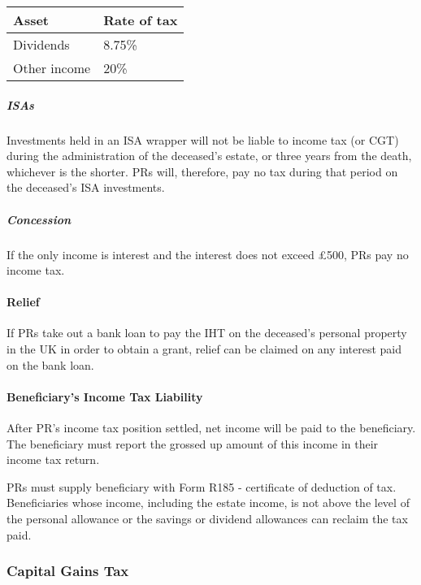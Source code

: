 \documentclass[
]{article}
\begin{document}
\begin{longtable}[]{@{}ll@{}}
\toprule()
Asset & Rate of tax \\
\midrule()
\endhead
Dividends & 8.75\% \\
Other income & 20\% \\
\bottomrule()
\end{longtable}

\hypertarget{isas}{%
\subparagraph{ISAs}\label{isas}}

Investments held in an ISA wrapper will not be liable to income tax (or
CGT) during the administration of the deceased's estate, or three years
from the death, whichever is the shorter. PRs will, therefore, pay no
tax during that period on the deceased's ISA investments.

\hypertarget{concession}{%
\subparagraph{Concession}\label{concession}}

If the only income is interest and the interest does not exceed £500,
PRs pay no income tax.

\hypertarget{relief}{%
\paragraph{Relief}\label{relief}}

If PRs take out a bank loan to pay the IHT on the deceased's personal
property in the UK in order to obtain a grant, relief can be claimed on
any interest paid on the bank loan.

\hypertarget{beneficiarys-income-tax-liability}{%
\paragraph{Beneficiary's Income Tax
Liability}\label{beneficiarys-income-tax-liability}}

After PR's income tax position settled, net income will be paid to the
beneficiary. The beneficiary must report the grossed up amount of this
income in their income tax return.

PRs must supply beneficiary with Form R185 - certificate of deduction of
tax. Beneficiaries whose income, including the estate income, is not
above the level of the personal allowance or the savings or dividend
allowances can reclaim the tax paid.

\hypertarget{capital-gains-tax}{%
\subsubsection{Capital Gains Tax}\label{capital-gains-tax}}
\end{document}
